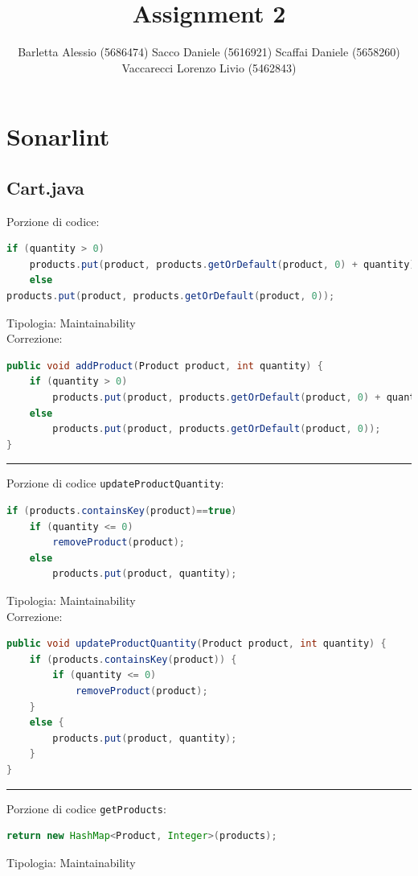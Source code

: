 \documentclass{article}
\title{Assignment 2}
\author{\footnotesize Barletta Alessio (5686474)
Sacco Daniele (5616921)
Scaffai Daniele (5658260)
Vaccarecci Lorenzo Livio (5462843)\normalsize}
\date{}
\begin{document}
\maketitle

\section{Sonarlint}
\subsection{Cart.java}
Porzione di codice:
\begin{lstlisting}[language=Java]
if (quantity > 0)
    products.put(product, products.getOrDefault(product, 0) + quantity);
    else 
products.put(product, products.getOrDefault(product, 0));
\end{lstlisting}
Tipologia: Maintainability\\
Correzione:
\begin{lstlisting}[language=Java]
public void addProduct(Product product, int quantity) {
    if (quantity > 0)
        products.put(product, products.getOrDefault(product, 0) + quantity);
    else 
        products.put(product, products.getOrDefault(product, 0));
}
\end{lstlisting}
\vspace{.5em}\hrule\vspace{.5em}
Porzione di codice \texttt{updateProductQuantity}:
\begin{lstlisting}[language=Java]
if (products.containsKey(product)==true)
    if (quantity <= 0) 
        removeProduct(product);
    else 
        products.put(product, quantity);
\end{lstlisting}
Tipologia: Maintainability\\
Correzione:
\begin{lstlisting}[language=Java]
public void updateProductQuantity(Product product, int quantity) {
    if (products.containsKey(product)) {
        if (quantity <= 0) 
            removeProduct(product);
    }
    else { 
        products.put(product, quantity);
    }
}
\end{lstlisting}
\vspace{.5em}\hrule\vspace{.5em}
Porzione di codice \texttt{getProducts}:
\begin{lstlisting}[language=Java]
return new HashMap<Product, Integer>(products);
\end{lstlisting}
Tipologia: Maintainability\\
\end{document}
